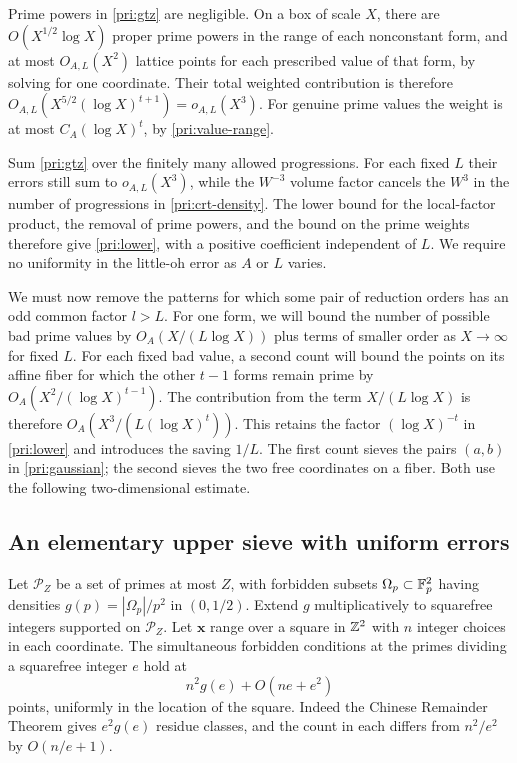Prime powers in \eqref{pri:gtz} are negligible.  On a box of scale $X$,
there are $O(X^{1/2}\log X)$ proper prime powers in the range of each
nonconstant form, and at most $O_{A,L}(X^2)$ lattice points for each
prescribed value of that form, by solving for one coordinate.  Their
total weighted contribution is therefore
$O_{A,L}(X^{5/2}(\log X)^{t+1})=o_{A,L}(X^3)$.
For genuine prime values the weight is at most $C_A(\log X)^t$, by
\eqref{pri:value-range}.

Sum \eqref{pri:gtz} over the finitely many allowed progressions. For
each fixed $L$ their errors still sum to $o_{A,L}(X^3)$, while the
$W^{-3}$ volume factor cancels the $W^3$ in the number of progressions
in \eqref{pri:crt-density}. The lower bound for the local-factor product,
the removal of prime powers, and the bound on the prime weights therefore
give \eqref{pri:lower}, with a positive coefficient independent of $L$.
We require no uniformity in the little-oh error as $A$ or $L$ varies.

We must now remove the patterns for which some pair of reduction orders
has an odd common factor $l>L$. For one form, we will bound the number of
possible bad prime values by $O_A(X/(L\log X))$ plus terms of smaller
order as $X\to\infty$ for fixed $L$. For each fixed bad value, a second
count will bound the points on
its affine fiber for which the other $t-1$ forms remain prime by
$O_A(X^2/(\log X)^{t-1})$. The contribution from the term
$X/(L\log X)$ is therefore $O_A(X^3/(L(\log X)^t))$. This retains the
factor $(\log X)^{-t}$ in \eqref{pri:lower} and introduces the saving $1/L$.
The first count sieves the pairs $(a,b)$ in \eqref{pri:gaussian}; the
second sieves the two free coordinates on a fiber. Both use the following
two-dimensional estimate.

\subsection{An elementary upper sieve with uniform errors}

Let $\mathcal P_Z$ be a set of primes at most $Z$, with forbidden subsets
$\Omega_p\subset\mathbb F_p^2$ having densities
$g(p)=|\Omega_p|/p^2$ in $(0,1/2)$.  Extend $g$ multiplicatively to
squarefree integers supported on $\mathcal P_Z$. Let $\mathbf x$ range
over a square in $\mathbb Z^2$ with $n$ integer choices in each coordinate.
The simultaneous forbidden conditions at the primes dividing a
squarefree integer $e$ hold at
\begin{equation}\label{pri:residue-error}
                          n^2g(e)+O(ne+e^2)
\end{equation}
points, uniformly in the location of the square.  Indeed the Chinese
Remainder Theorem gives $e^2g(e)$ residue classes, and the count in
each differs from $n^2/e^2$ by $O(n/e+1)$.

